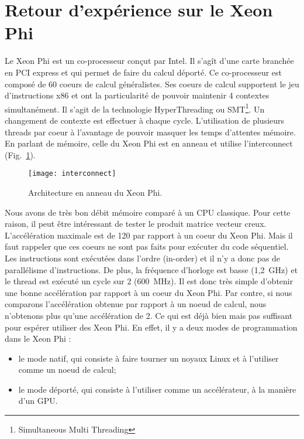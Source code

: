 \section{Retour d'expérience sur le Xeon Phi}
Le Xeon Phi est un co-processeur conçut par Intel.
%
Il s'agît d'une carte branchée en PCI express et qui permet de faire du calcul déporté.
%
Ce co-processeur est composé de 60 coeurs de calcul généralistes.
%
Ses coeurs de calcul supportent le jeu d'instructions x86 et ont la particularité de pouvoir maintenir 4 contextes simultanément.
%
Il s'agit de la technologie HyperThreading ou SMT\footnote{Simultaneous Multi Threading}.
%
Un changement de contexte est effectuer à chaque cycle.
%
L'utilisation de plusieurs threads par coeur à l'avantage de pouvoir masquer les temps d'attentes mémoire.
%
En parlant de mémoire, celle du Xeon Phi est en anneau et utilise l'interconnect (Fig.~\ref{fig:interconnect}).

\begin{figure}[t!]
  \centering
  \texttt{[image: interconnect]}
  \caption{Architecture en anneau du Xeon Phi.}
  \label{fig:interconnect}
\end{figure}


Nous avons de très bon débit mémoire comparé à un CPU classique.
%
Pour cette raison, il peut être intéressant de tester le produit matrice vecteur creux.
%
L'accélération maximale est de 120 par rapport à un coeur du Xeon Phi.
%
Mais il faut rappeler que ces coeurs ne sont pas faits pour exécuter du code séquentiel.
%
Les instructions sont exécutées dans l'ordre (in-order) et il n'y a donc pas de parallélisme d'instructions.
%
De plus, la fréquence d'horloge est basse (1,2~GHz) et le thread est exécuté un cycle sur 2 (600~MHz).
%
Il est donc très simple d'obtenir une bonne accélération par rapport à un coeur du Xeon Phi.
%
Par contre, si nous comparons l'accélération obtenue par rapport à un noeud de calcul, nous n'obtenons plus qu'une accélération de 2.
%
Ce qui est déjà bien mais pas suffisant pour espérer utiliser des Xeon Phi.
%
En effet, il y a deux modes de programmation dans le Xeon Phi :
\begin{itemize}
    \item le mode natif, qui consiste à faire tourner un noyaux Linux et à l'utiliser comme un noeud de calcul;
    \item le mode déporté, qui consiste à l'utiliser comme un accélérateur, à la manière d'un GPU.
\end{itemize}

